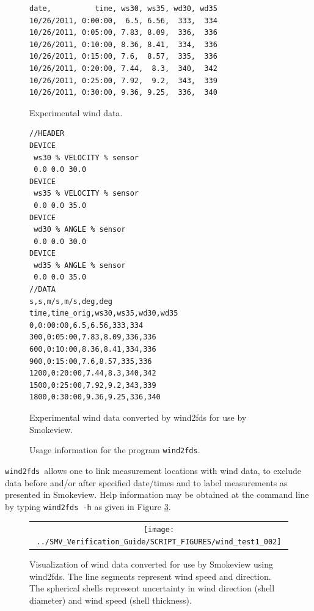 \documentclass[11pt,twoside]{book}
\begin{document}
\begin{figure}[\figoptions]
{\small
\begin{verbatim}
date,          time, ws30, ws35, wd30, wd35
10/26/2011, 0:00:00,  6.5, 6.56,  333,  334
10/26/2011, 0:05:00, 7.83, 8.09,  336,  336
10/26/2011, 0:10:00, 8.36, 8.41,  334,  336
10/26/2011, 0:15:00, 7.6,  8.57,  335,  336
10/26/2011, 0:20:00, 7.44,  8.3,  340,  342
10/26/2011, 0:25:00, 7.92,  9.2,  343,  339
10/26/2011, 0:30:00, 9.36, 9.25,  336,  340
\end{verbatim}
}
\caption {Experimental wind data.}
\label{fig:winddata}%
\end{figure}


\begin{figure}[\figoptions]
{\small
\begin{verbatim}
//HEADER
DEVICE
 ws30 % VELOCITY % sensor
 0.0 0.0 30.0
DEVICE
 ws35 % VELOCITY % sensor
 0.0 0.0 35.0
DEVICE
 wd30 % ANGLE % sensor
 0.0 0.0 30.0
DEVICE
 wd35 % ANGLE % sensor
 0.0 0.0 35.0
//DATA
s,s,m/s,m/s,deg,deg
time,time_orig,ws30,ws35,wd30,wd35
0,0:00:00,6.5,6.56,333,334
300,0:05:00,7.83,8.09,336,336
600,0:10:00,8.36,8.41,334,336
900,0:15:00,7.6,8.57,335,336
1200,0:20:00,7.44,8.3,340,342
1500,0:25:00,7.92,9.2,343,339
1800,0:30:00,9.36,9.25,336,340
\end{verbatim}
}
\caption {Experimental wind data converted by wind2fds for use by Smokeview.}
\label{fig:convertedwinddata}%
\end{figure}

\begin{figure}[\figoptions]
{\small

}
\caption {Usage information for the program {\tt wind2fds}.}
\label{figwind2fdsusage}%
\end{figure}

{\tt wind2fds}\ allows one to link measurement locations with wind data, to exclude data before and/or after specified date/times and to label measurements as presented in Smokeview.
Help information may be obtained at the command line
by typing {\tt wind2fds -h} as given in Figure \ref{figwind2fdsusage}.

\begin{figure}[\figoptions]
\begin{center}
\begin{tabular}{c}
 \texttt{[image: ../SMV\_Verification\_Guide/SCRIPT\_FIGURES/wind\_test1\_002]}
 \end{tabular}
\end{center}
 \caption{Visualization of wind data converted for use by Smokeview using wind2fds. The line segments represent
 wind speed and direction.  The spherical shells represent uncertainty
 in wind direction (shell diameter) and wind speed (shell thickness).}
\label{figwind}%
\end{figure}
\end{document}
